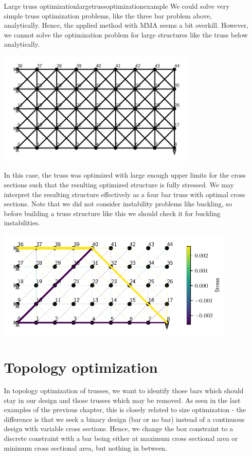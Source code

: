\begin{example}{Large truss optimization}{largetrussoptimizationexample} 
    We could solve very simple truss optimization problems, like the three bar problem above, analytically. Hence, the applied method with MMA seems a bit overkill. 
    However, we cannot solve the optimization problem for large structures like the truss below analytically. 

    \begin{center}
        \includegraphics[width=0.75\textwidth]{figures/large_truss.pdf} 
    \end{center}

    In this case, the truss was optimized with large enough upper limits for the cross sections such that the resulting optimized structure is fully stressed. We may interpret the resulting structure effectively as a four bar truss with optimal cross sections. Note that we did not consider instability problems like buckling, so before building a truss structure like this we should check it for buckling instabilities.

    \begin{center}
        \includegraphics[width=0.9\textwidth]{figures/large_truss_optimized.pdf} 
    \end{center}
\end{example}

\section{Topology optimization}
In topology optimization of trusses, we want to identify those bars which should stay in our design and those trusses which may be removed. As seen in the last examples of the previous chapter, this is closely related to size optimization - the difference is that we seek a binary design (bar or no bar) instead of a continuous design with variable cross sections. Hence, we change the box constraint to a discrete constraint with a bar being either at maximum cross sectional area or minimum cross sectional area, but nothing in between.

